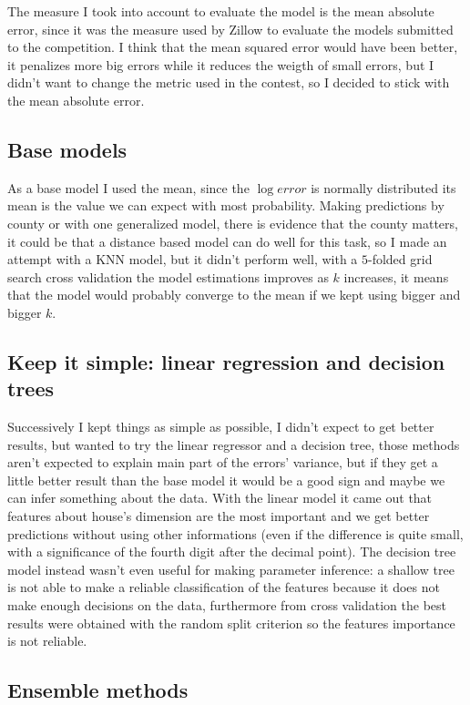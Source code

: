 The measure I took into account to evaluate the model is the mean absolute error, since it was the measure used by Zillow to evaluate the models submitted to the competition. I think that the mean squared error would have been better, it penalizes more big errors while it reduces the weigth of small errors, but I didn't want to change the metric used in the contest, so I decided to stick with the mean absolute error.

\subsection{Base models}

As a base model I used the mean, since the $\log error$ is normally distributed its mean is the value we can expect with most probability. Making predictions by county or with one generalized model, there is evidence that the county matters, it could be that a distance based model can do well for this task, so I made an attempt with a KNN model, but it didn't perform well, with a $5$-folded grid search cross validation the model estimations improves as $k$ increases, it means that the model would probably converge to the mean if we kept using bigger and bigger $k$.

\subsection{Keep it simple: linear regression and decision trees}

Successively I kept things as simple as possible, I didn't expect to get better results, but wanted to try the linear regressor and a decision tree, those methods aren't expected to explain main part of the errors' variance, but if they get a little better result than the base model it would be a good sign and maybe we can infer something about the data. With the linear model it came out that features about house's dimension are the most important and we get better predictions without using other informations (even if the difference is quite small, with a significance of the fourth digit after the decimal point). The decision tree model instead wasn't even useful for making parameter inference: a shallow tree is not able to make a reliable classification of the features because it does not make enough decisions on the data, furthermore from cross validation the best results were obtained with the random split criterion so the features importance is not reliable.

\subsection{Ensemble methods}


